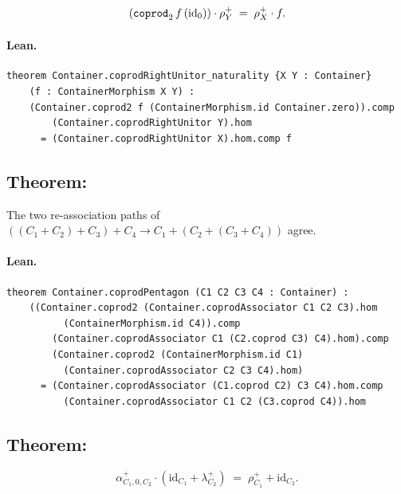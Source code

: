 \documentclass[11pt,a4paper]{article}
\begin{document}
\begin{thm}
\[
  (\texttt{coprod}_2\,f\,(\mathrm{id}_0)) \cdot \rho^+_Y
  \;=\;
  \rho^+_X \cdot f.
\]
\end{thm}

\paragraph{Lean.}
\begin{lstlisting}[style=lean]
theorem Container.coprodRightUnitor_naturality {X Y : Container}
    (f : ContainerMorphism X Y) :
    (Container.coprod2 f (ContainerMorphism.id Container.zero)).comp
        (Container.coprodRightUnitor Y).hom
      = (Container.coprodRightUnitor X).hom.comp f
\end{lstlisting}


\subsection{Theorem: }

\begin{thm}
The two re-association paths of
$((C_1 + C_2) + C_3) + C_4 \to C_1 + (C_2 + (C_3 + C_4))$ agree.
\end{thm}

\paragraph{Lean.}
\begin{lstlisting}[style=lean]
theorem Container.coprodPentagon (C1 C2 C3 C4 : Container) :
    ((Container.coprod2 (Container.coprodAssociator C1 C2 C3).hom
          (ContainerMorphism.id C4)).comp
        (Container.coprodAssociator C1 (C2.coprod C3) C4).hom).comp
        (Container.coprod2 (ContainerMorphism.id C1)
          (Container.coprodAssociator C2 C3 C4).hom)
      = (Container.coprodAssociator (C1.coprod C2) C3 C4).hom.comp
          (Container.coprodAssociator C1 C2 (C3.coprod C4)).hom
\end{lstlisting}


\subsection{Theorem: }

\begin{thm}
\[
  \alpha^+_{C_1,0,C_2} \cdot (\mathrm{id}_{C_1} + \lambda^+_{C_2})
  \;=\;
  \rho^+_{C_1} + \mathrm{id}_{C_2}.
\]
\end{thm}
\end{document}
